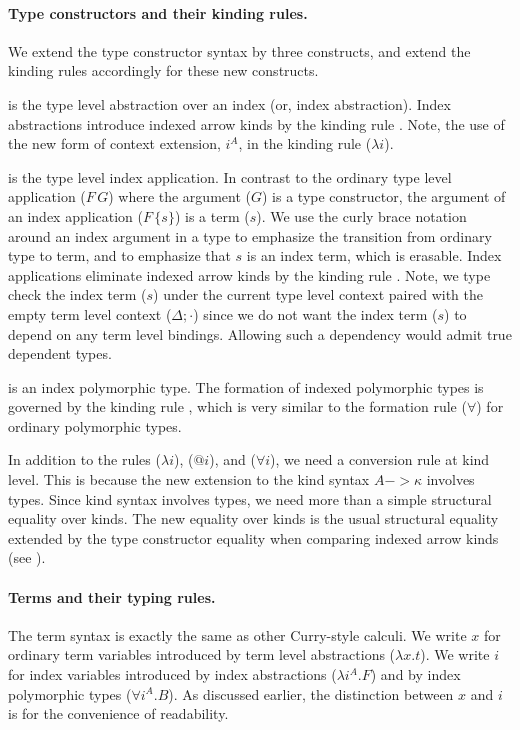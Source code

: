 \paragraph{Type constructors and their kinding rules.}
We extend the type constructor syntax by three constructs,
and extend the kinding rules accordingly for these new constructs.

 is the type level abstraction over an index
(or, index abstraction). Index abstractions introduce indexed arrow kinds
by the kinding rule . Note, the use of the new form of context
extension, $i^A$, in the kinding rule ($\lambda i$).


 is the type level index application. In contrast to
the ordinary type level application ($F\,G$) where the argument ($G$) is
a type constructor, the argument of an index application ($F\,\{s\}$) is
a term ($s$). We use the curly brace notation around an index argument in a type to
emphasize the transition from ordinary type to term, and to emphasize
that $s$ is an index term, which is erasable. Index applications eliminate
indexed arrow kinds by the kinding rule . Note, we type check
the index term ($s$) under the current type level context paired with
the empty term level context ($\Delta;\cdot$) since we do not want
the index term ($s$) to depend on any term level bindings. Allowing such
a dependency would admit true dependent types.

 is an index polymorphic type.
The formation of indexed polymorphic types is governed by
the kinding rule , which is very similar to
the formation rule ($\forall$) for ordinary polymorphic types.

In addition to the rules ($\lambda i$), ($@ i$), and ($\forall i$),
we need a conversion rule  at kind level. This is because
the new extension to the kind syntax $A -> \kappa$ involves types.
Since kind syntax involves types, we need more than a simple
structural equality over kinds. The new equality over kinds is
the usual structural equality extended by the type constructor equality
when comparing indexed arrow kinds (see ).

\paragraph{Terms and their typing rules.}
The term syntax is exactly the same as other Curry-style calculi.
We write $x$ for ordinary term variables introduced by
term level abstractions ($\lambda x.t$).
We write $i$ for index variables introduced by
index abstractions ($\lambda i^A.F$) and by
index polymorphic types ($\forall i^A.B$). As discussed earlier, the distinction between
$x$ and $i$ is for the convenience of readability.

